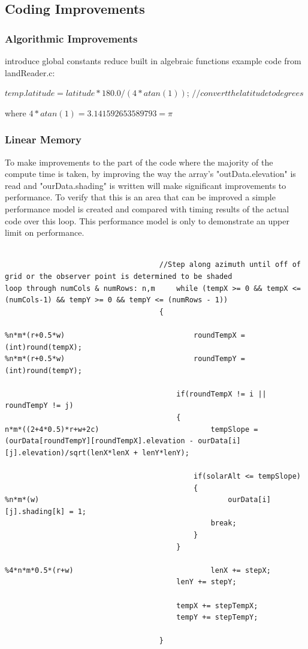 \documentclass[]{article}%
\begin{document}
\subsection{Coding Improvements}

\subsubsection{Algorithmic Improvements}
introduce global constants
reduce built in algebraic functions
example code from landReader.c:

$temp.latitude = latitude*180.0/(4*atan(1))$;	$//convert the latitude to degrees	$

where $4*atan(1) = 3.141592653589793 = \pi$

\subsubsection{Linear Memory}

To make improvements to the part of the code where the majority of the compute time is taken, by improving the way the array's "outData.elevation" is read and "ourData.shading" is written will make significant improvements to performance. To verify that this is an area that can be improved a simple performance model is created and compared with timing results of the actual code over this loop. This performance model is only to demonstrate an upper limit on performance.



{\small
\begin{verbatim}

									//Step along azimuth until off of grid or the observer point is determined to be shaded
loop through numCols & numRows: n,m		while (tempX >= 0 && tempX <= (numCols-1) && tempY >= 0 && tempY <= (numRows - 1))
									{	
									
%n*m*(r+0.5*w)								roundTempX = (int)round(tempX);
%n*m*(r+0.5*w)								roundTempY = (int)round(tempY);			
									
										if(roundTempX != i ||  roundTempY != j) 
										{
n*m*((2+4*0.5)*r+w+2c)							tempSlope = (ourData[roundTempY][roundTempX].elevation - ourData[i][j].elevation)/sqrt(lenX*lenX + lenY*lenY);	
									
											if(solarAlt <= tempSlope)
											{	
%n*m*(w)											ourData[i][j].shading[k] = 1;
												break;
											}
										}												
									
%4*n*m*0.5*(r+w)								lenX += stepX;		
										lenY += stepY;
									
										tempX += stepTempX;
										tempY += stepTempY;
									
									}
\end{verbatim}}
\end{document}
